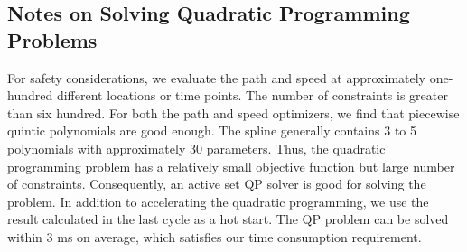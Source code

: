 \documentclass{thesisreport}
\begin{document}
\subsection{Notes on Solving Quadratic Programming Problems}
For safety considerations, we evaluate the path and speed at approximately one-hundred different locations or time points. The number of constraints is greater than six hundred. For both the path and speed optimizers, we find that piecewise quintic polynomials are good enough. The spline generally contains 3 to 5 polynomials with approximately 30 parameters. Thus, the quadratic programming problem has a relatively small objective function but large number of constraints. Consequently, an active set QP solver is good for solving the problem. In addition to accelerating the quadratic programming, we use the result calculated in the last cycle as a hot start. The QP problem can be solved within 3 ms on average, which satisfies our time consumption requirement.
\end{document}
